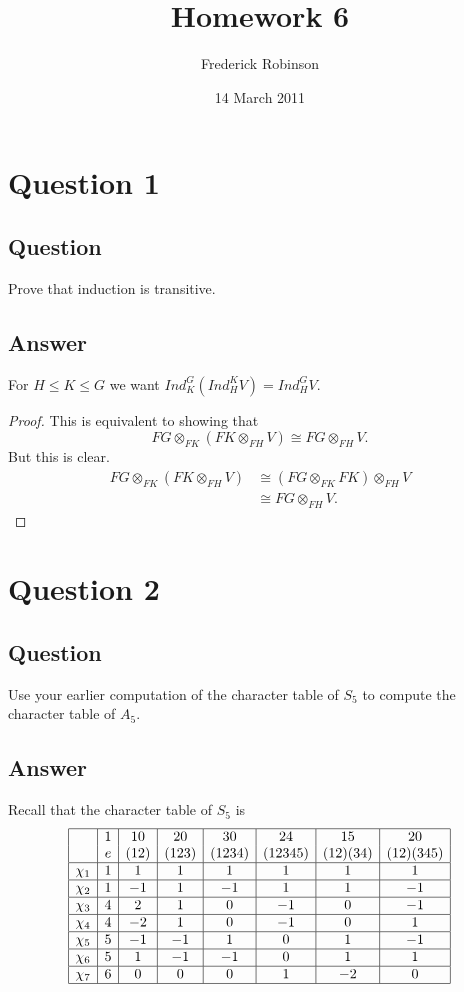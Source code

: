 \documentclass[11pt]{article}
\begin{document}



\title{Homework 6}
\author{Frederick Robinson}
\date{14 March 2011}
\maketitle




\section{Question 1}
\subsection{Question}
Prove that induction is transitive.
\subsection{Answer}
For $H \leq K \leq G$ we want $Ind_K^G ( Ind_H^K V) = Ind_H^G V$.

\begin{proof}
This is equivalent to showing that
\[FG\otimes_{FK} (FK \otimes_{FH} V ) \cong FG \otimes_{FH } V.\]
But this is clear. 
\begin{align*}
FG \otimes_{FK } (FK \otimes_{FH } V) &\cong (FG \otimes_{FK} FK ) \otimes_{FH} V \\
&\cong FG \otimes_{FH} V.
\end{align*}
\end{proof}

\section{Question 2}
\subsection{Question}
Use your earlier computation of the character table of $S_5$ to compute the character table of $A_5$.
\subsection{Answer}
Recall that the  character table of $S_5$ is
\[
\begin{array}{|c|c|c|c|c|c|c|c|}
\hline
&1&10&20&30&24&15&20\\
&e&(12)&(123)&(1234)&(12345)&(12)(34)&(12)(345)\\
\hline
\chi_1&1&1&1&1&1&1&1\\
\hline
\chi_2&1&-1&1&-1&1&1&-1\\
\hline
\chi_3&4&2&1&0&-1&0&-1\\
\hline
\chi_4&4&-2&1&0&-1&0&1\\
\hline
\chi_5&5&-1&-1&1&0&1&-1\\
\hline
\chi_6&5&1&-1&-1&0&1&1\\
\hline
\chi_7&6&0&0&0&1&-2&0\\
\hline
\end{array}\]
\end{document}
